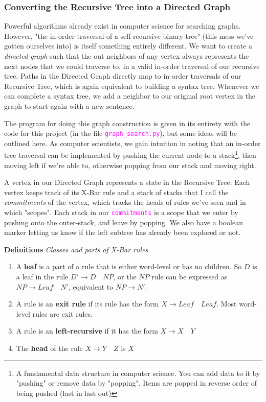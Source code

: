 \documentclass[runningheads]{llncs}
\newcommand{\code}[1]{\texttt{\textcolor{magenta}{\setlength{\fboxsep}{1pt}\colorbox{lightgray!20}{#1}}}}
\begin{document}
\subsubsection{Converting the Recursive Tree into a Directed Graph}
Powerful algorithms already exist in computer science for searching graphs. However, "the in-order traversal of a self-recursive binary tree" (this mess we've gotten ourselves into) is itself something entirely different. We want to create a \textit{directed graph} such that the out neighbors of any vertex always represents the next nodes that we could traverse to, in a valid in-order traversal of our recursive tree. Paths in the Directed Graph directly map to in-order traversals of our Recursive Tree, which is again equivalent to building a syntax tree. Whenever we can complete a syntax tree,  we add a neighbor to our original root vertex in the graph to start again with a new sentence.

The program for doing this graph construction is given in its entirety with the code for this project (in the file \code{graph\_search.py}), but some ideas will be outlined here. As computer scientists, we gain intuition in noting that an in-order tree traversal can be implemented by pushing the current node to a stack\footnote{A fundamental data structure in computer science. You can add data to it by "pushing" or remove data by "popping". Items are popped in reverse order of being pushed (last in last out)}, then moving left if we're able to, otherwise popping from our stack and moving right.

A vertex in our Directed Graph represents a state in the Recursive Tree. Each vertex keeps track of its X-Bar rule and a stack of stacks that I call the \textit{commitments} of the vertex, which tracks the heads of rules we've seen and in which "scopes". Each stack in our \code{commitments} is a scope that we enter by pushing onto the outer-stack, and leave by popping. We also have a boolean marker letting us know if the left subtree has already been explored or not.

\begin{tcolorbox}[colframe=black,colback=white,boxrule=0.5pt,arc=2pt]
\textbf{Definitions} \textit{Classes and parts of X-Bar rules}
\begin{enumerate}
	\item A \textbf{leaf} is a part of a rule that is either word-level or has no children. So $D$ is a leaf in the rule $D' \rightarrow D \quad NP$, or the $NP$ rule can be expressed as $NP \rightarrow Leaf \quad N'$, equivalent to $NP \rightarrow N'$.
	\item A rule is an \textbf{exit rule} if its rule has the form $X \rightarrow Leaf \quad Leaf$. Most word-level rules are exit rules.
	\item A rule is an \textbf{left-recursive} if it has the form $X \rightarrow X \quad Y$
	\item The  \textbf{head} of the rule $X \rightarrow Y \quad Z$ is $X$
\end{enumerate}
\end{tcolorbox}
\end{document}
